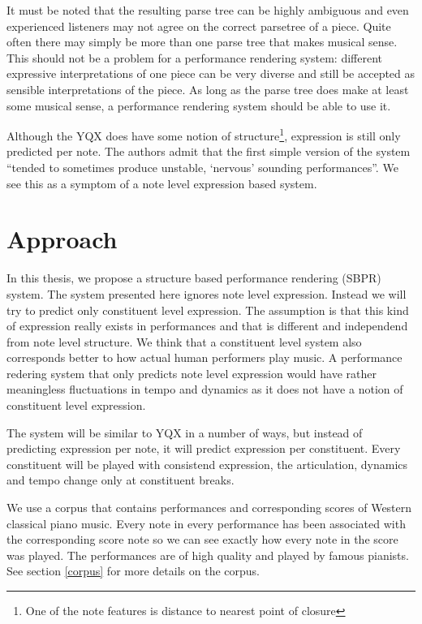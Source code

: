 \documentclass[a4paper,10pt]{article}
\begin{document}
It must be noted that the resulting parse tree can be highly ambiguous and even experienced listeners may not agree on the correct parsetree of a piece. Quite often there may simply be more than one parse tree that makes musical sense. This should not be a problem for a performance rendering system: different expressive interpretations of one piece can be very diverse and still be accepted as sensible interpretations of the piece. As long as the parse tree does make at least some musical sense, a performance rendering system should be able to use it.

Although the YQX does have some notion of structure\footnote{One of the note features is distance to nearest point of closure}, expression is still only predicted per note. The authors admit that the first simple version of the system ``tended to sometimes produce unstable, `nervous' sounding performances''. We see this as a symptom of a note level expression based system.

\section{Approach}


In this thesis, we propose a structure based performance rendering (SBPR) system. The system presented here ignores note level expression. Instead we will try to predict only constituent level expression. The assumption is that this kind of expression really exists in performances and that is different and independend from note level structure. We think that a constituent level system also corresponds better to how actual human performers play music. A performance redering system that only predicts note level expression would have rather meaningless fluctuations in tempo and dynamics as it does not have a notion of constituent level expression.


The system will be similar to YQX in a number of ways, but instead of predicting expression per note, it will predict expression per constituent. Every constituent will be played with consistend expression, the articulation, dynamics and tempo change only at constituent breaks.

We use a corpus that contains performances and corresponding scores of Western classical piano music. Every note in every performance has been associated with the corresponding score note so we can see exactly how every note in the score was played. The performances are of high quality and played by famous pianists. See section \ref{corpus} for more details on the corpus.
\end{document}
